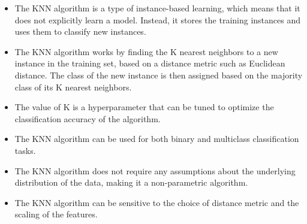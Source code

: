 \documentclass[12pt,a4paper, brazil]{article}
\begin{document}
\begin{itemize}
  \item The KNN algorithm is a type of instance-based learning, which means that it does not explicitly learn a model. Instead, it stores the training instances and uses them to classify new instances.
  
  \item The KNN algorithm works by finding the K nearest neighbors to a new instance in the training set, based on a distance metric such as Euclidean distance. The class of the new instance is then assigned based on the majority class of its K nearest neighbors.
  
  \item The value of K is a hyperparameter that can be tuned to optimize the classification accuracy of the algorithm.
  
  \item The KNN algorithm can be used for both binary and multiclass classification tasks.
  
  \item The KNN algorithm does not require any assumptions about the underlying distribution of the data, making it a non-parametric algorithm.
  
  \item The KNN algorithm can be sensitive to the choice of distance metric and the scaling of the features.
\end{itemize}
\end{document}
